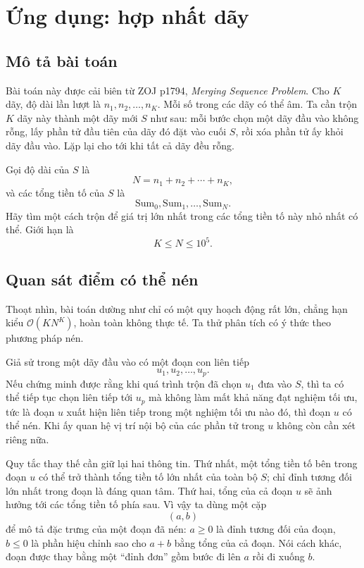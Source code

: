 \documentclass[11pt]{article}
\newcommand{\Oh}{\mathcal{O}}
\begin{document}
\section{Ứng dụng: hợp nhất dãy}

\subsection{Mô tả bài toán}

Bài toán này được cải biên từ ZOJ p1794, \textit{Merging Sequence Problem}.
Cho $K$ dãy, độ dài lần lượt là $n_1,n_2,\ldots,n_K$. Mỗi số trong các dãy có
thể âm. Ta cần trộn $K$ dãy này thành một dãy mới $S$ như sau: mỗi bước chọn
một dãy đầu vào không rỗng, lấy phần tử đầu tiên của dãy đó đặt vào cuối $S$,
rồi xóa phần tử ấy khỏi dãy đầu vào. Lặp lại cho tới khi tất cả dãy đều rỗng.

Gọi độ dài của $S$ là
\[
  N=n_1+n_2+\cdots+n_K,
\]
và các tổng tiền tố của $S$ là
\[
  \mathrm{Sum}_0,\mathrm{Sum}_1,\ldots,\mathrm{Sum}_N.
\]
Hãy tìm một cách trộn để giá trị lớn nhất trong các tổng tiền tố này nhỏ nhất
có thể. Giới hạn là
\[
  K\le N\le 10^5.
\]

\subsection{Quan sát điểm có thể nén}

Thoạt nhìn, bài toán dường như chỉ có một quy hoạch động rất lớn, chẳng hạn
kiểu $\Oh(KN^K)$, hoàn toàn không thực tế. Ta thử phân tích có ý thức theo
phương pháp nén.

Giả sử trong một dãy đầu vào có một đoạn con liên tiếp
\[
  u_1,u_2,\ldots,u_p.
\]
Nếu chứng minh được rằng khi quá trình trộn đã chọn $u_1$ đưa vào $S$, thì ta
có thể tiếp tục chọn liên tiếp tới $u_p$ mà không làm mất khả năng đạt nghiệm
tối ưu, tức là đoạn $u$ xuất hiện liên tiếp trong một nghiệm tối ưu nào đó,
thì đoạn $u$ có thể nén. Khi ấy quan hệ vị trí nội bộ của các phần tử trong
$u$ không còn cần xét riêng nữa.

Quy tắc thay thế cần giữ lại hai thông tin. Thứ nhất, một tổng tiền tố bên
trong đoạn $u$ có thể trở thành tổng tiền tố lớn nhất của toàn bộ $S$; chỉ
đỉnh tương đối lớn nhất trong đoạn là đáng quan tâm. Thứ hai, tổng của cả đoạn
$u$ sẽ ảnh hưởng tới các tổng tiền tố phía sau. Vì vậy ta dùng một cặp
\[
  (a,b)
\]
để mô tả đặc trưng của một đoạn đã nén: $a\ge 0$ là đỉnh tương đối của đoạn,
$b\le 0$ là phần hiệu chỉnh sao cho $a+b$ bằng tổng của cả đoạn. Nói cách
khác, đoạn được thay bằng một ``đỉnh đơn'' gồm bước đi lên $a$ rồi đi xuống
$b$.
\end{document}
